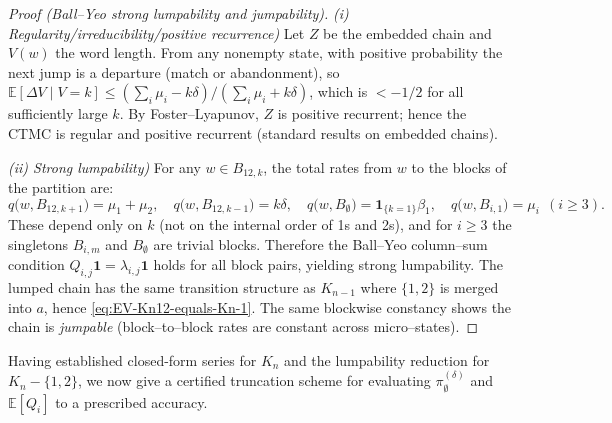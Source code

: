 \documentclass[11pt]{article}
\begin{document}
\begin{proof}[Proof (Ball–Yeo strong lumpability and jumpability\cite{BaYe93})]
	\emph{(i) Regularity/irreducibility/positive recurrence)} Let $Z$ be the embedded chain and $V(w)$ the word length. From any nonempty state, with positive probability the next jump is a departure (match or abandonment), so $\mathbb{E}[\Delta V\mid V=k]\le (\sum_i\mu_i-k\delta)/(\sum_i\mu_i+k\delta)$, which is $<-1/2$ for all sufficiently large $k$. By Foster–Lyapunov, $Z$ is positive recurrent; hence the CTMC is regular and positive recurrent (standard results on embedded chains).
	
	\emph{(ii) Strong lumpability)} For any $w\in B_{12,k}$, the total rates from $w$ to the blocks of the partition are:
	\[
	q\bigl(w,B_{12,k+1}\bigr)=\mu_1+\mu_2,\quad
	q\bigl(w,B_{12,k-1}\bigr)=k\delta,\quad
	q\bigl(w,B_{\emptyset}\bigr)=\mathbf{1}_{\{k=1\}}\beta_1,\quad
	q\bigl(w,B_{i,1}\bigr)=\mu_i\ \ (i\ge3).
	\]
	These depend only on $k$ (not on the internal order of 1s and 2s), and for $i\ge3$ the singletons $B_{i,m}$ and $B_{\emptyset}$ are trivial blocks. Therefore the Ball–Yeo column–sum condition $Q_{i,j}\mathbf{1}=\lambda_{i,j}\mathbf{1}$ holds for all block pairs, yielding strong lumpability. The lumped chain has the same transition structure as $K_{n-1}$ where $\{1,2\}$ is merged into $a$, hence \eqref{eq:EV-Kn12-equals-Kn-1}. The same blockwise constancy shows the chain is \emph{jumpable} (block–to–block rates are constant across micro–states).
\end{proof}
Having established closed-form series for $K_n$
and the lumpability reduction for 
$K_n-\{1,2\}$, we now give a certified truncation scheme for evaluating 
$\pi_{\emptyset}^{(\delta)}$
and 
$\mathbb{E}[Q_i]$
to a prescribed accuracy.
\end{document}

